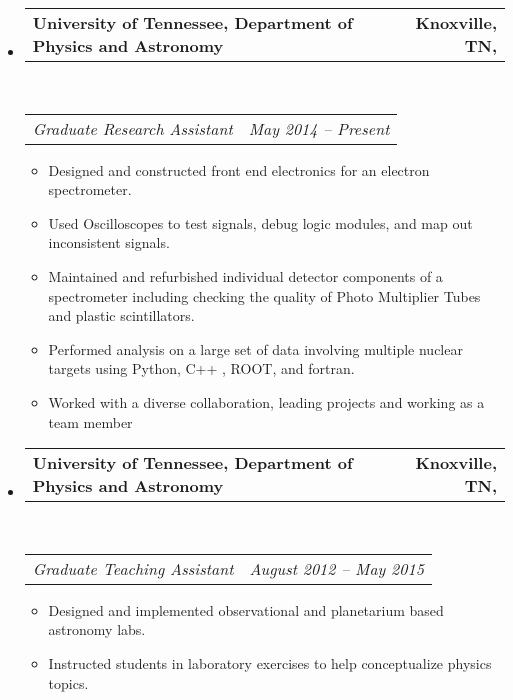 \documentclass[12pt,letterpaper]{article}
\makeatletter
\newcommand{\headerrow}[2]
{\begin{tabular*}{\linewidth}{l@{\extracolsep{\fill}}r}
	#1 &
	#2 \\
\end{tabular*}}
\makeatother
\begin{document}
\begin{itemize}
	\parskip=0.1em

	\item
	\headerrow
		{\textbf{University of Tennessee, Department of Physics and Astronomy }}
		{\textbf{  Knoxville, TN,}}
	\\
	\headerrow
		{\emph{Graduate Research Assistant }}
		{\emph{May 2014 -- Present}}
	\begin{itemize}
			\itemsep0em
			\item Designed and constructed front end electronics for an electron spectrometer.
			\item Used Oscilloscopes to test signals, debug logic modules, and map out inconsistent signals.  
			\item Maintained and refurbished individual detector components of a spectrometer including checking the quality of Photo Multiplier Tubes and plastic scintillators.
			\item Performed analysis on a large set of data involving multiple nuclear targets using Python, C++ , ROOT, and fortran. 
			\item Worked with a diverse collaboration, leading projects and working as a team member
	\end{itemize}
	\item
	\headerrow
		{\textbf{University of Tennessee, Department of Physics and Astronomy }}
		{\textbf{  Knoxville, TN,}}
	\\
	\headerrow
		{\emph{Graduate Teaching Assistant }}
		{\emph{August 2012 -- May 2015}}
	\begin{itemize}
		\item Designed and implemented observational and planetarium based astronomy labs.
		\item Instructed students in laboratory exercises to help conceptualize physics topics.
	\end{itemize}
\end{itemize}
\end{document}
